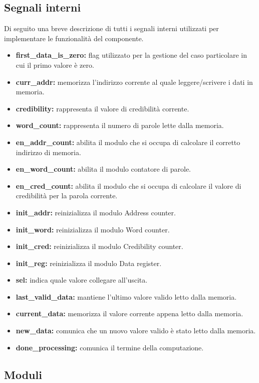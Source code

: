 \subsection{Segnali interni}
  Di seguito una breve descrizione di tutti i segnali interni utilizzati per implementare le funzionalità del componente.
\begin{itemize}
  \item \textbf{{first\_data\_is\_zero}:} flag utilizzato per la gestione del caso particolare in cui il primo valore è zero.
  \item \textbf{{curr\_addr}:} memorizza l'indirizzo corrente al quale leggere/scrivere i dati in memoria.
  \item \textbf{{credibility}:} rappresenta il valore di credibilità corrente.
  \item \textbf{{word\_count}:} rappresenta il numero di parole lette dalla memoria.
  \item \textbf{{en\_addr\_count}:} abilita il modulo che si occupa di calcolare il corretto indirizzo di memoria.
  \item \textbf{{en\_word\_count}:} abilita il modulo contatore di parole.
  \item \textbf{{en\_cred\_count}:} abilita il modulo che si occupa di calcolare il valore di credibilità per la parola corrente.
  \item \textbf{{init\_addr}:} reinizializza il modulo Address counter.
  \item \textbf{{init\_word}:} reinizializza il modulo Word counter.
  \item \textbf{{init\_cred}:} reinizializza il modulo Credibility counter.
  \item \textbf{{init\_reg}:} reinizializza il modulo Data register.
  \item \textbf{{sel}:} indica quale valore collegare all'uscita.
  \item \textbf{{last\_valid\_data}:} mantiene l'ultimo valore valido letto dalla memoria.
  \item \textbf{{current\_data}:} memorizza il valore corrente appena letto dalla memoria.
  \item \textbf{{new\_data}:} comunica che un nuovo valore valido è stato letto dalla memoria.
  \item \textbf{{done\_processing}:} comunica il termine della computazione.
\end{itemize}
\subsection{Moduli}
